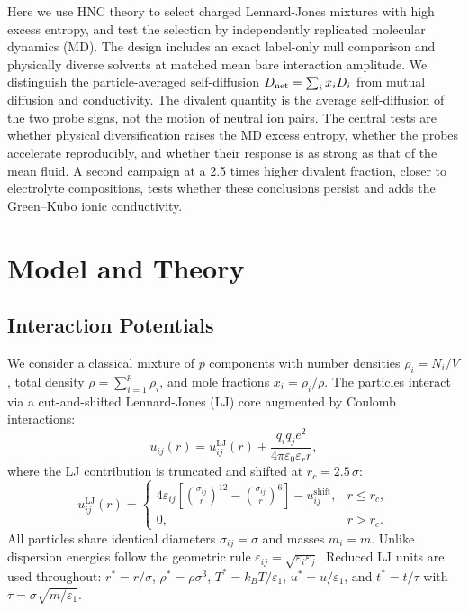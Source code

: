 \documentclass[aps,pre,twocolumn,superscriptaddress,floatfix]{revtex4-2}
\begin{document}
Here we use HNC theory to select charged Lennard-Jones mixtures with high excess entropy, and test the selection by independently replicated molecular dynamics (MD). The design includes an exact label-only null comparison and physically diverse solvents at matched mean bare interaction amplitude. We distinguish the particle-averaged self-diffusion $D_{\rm net}=\sum_i x_iD_i$ from mutual diffusion and conductivity. The divalent quantity is the average self-diffusion of the two probe signs, not the motion of neutral ion pairs. The central tests are whether physical diversification raises the MD excess entropy, whether the probes accelerate reproducibly, and whether their response is as strong as that of the mean fluid. A second campaign at a 2.5 times higher divalent fraction, closer to electrolyte compositions, tests whether these conclusions persist and adds the Green--Kubo ionic conductivity.

\section{Model and Theory}

\subsection{Interaction Potentials}

We consider a classical mixture of $p$ components with number densities $\rho_i = N_i / V$, total density $\rho = \sum_{i=1}^p \rho_i$, and mole fractions $x_i = \rho_i / \rho$. The particles interact via a cut-and-shifted Lennard-Jones (LJ) core augmented by Coulomb interactions:
\begin{equation}
u_{ij}(r) = u_{ij}^{\text{LJ}}(r) + \frac{q_i q_j e^2}{4\pi \varepsilon_0 \varepsilon_r r},
\label{eq:total_potential}
\end{equation}
where the LJ contribution is truncated and shifted at $r_c = 2.5\,\sigma$:
\begin{equation}
u_{ij}^{\text{LJ}}(r) =
\begin{cases}
4\varepsilon_{ij} \left[ \left(\frac{\sigma_{ij}}{r}\right)^{12} - \left(\frac{\sigma_{ij}}{r}\right)^6 \right] - u_{ij}^{\text{shift}}, & r \le r_c, \\
0, & r > r_c.
\end{cases}
\end{equation}
All particles share identical diameters $\sigma_{ij} = \sigma$ and masses $m_i = m$. Unlike dispersion energies follow the geometric rule $\varepsilon_{ij} = \sqrt{\varepsilon_i \varepsilon_j}$. Reduced LJ units are used throughout: $r^* = r/\sigma$, $\rho^* = \rho \sigma^3$, $T^* = k_B T / \varepsilon_1$, $u^* = u/\varepsilon_1$, and $t^* = t / \tau$ with $\tau = \sigma \sqrt{m/\varepsilon_1}$.
\end{document}
